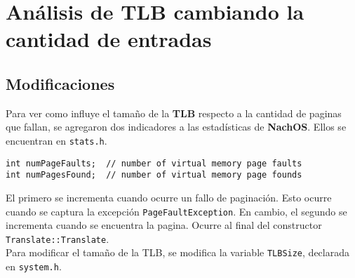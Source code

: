 \section{Análisis de TLB cambiando la cantidad de entradas}
\subsection*{Modificaciones}
Para ver como influye el tamaño de la \textbf{TLB} respecto a la cantidad de paginas que fallan, se agregaron dos indicadores a las estadísticas de \textbf{NachOS}. Ellos se encuentran en \texttt{stats.h}.
\begin{lstlisting}[style=C]
int numPageFaults;  // number of virtual memory page faults
int numPagesFound;  // number of virtual memory page founds
\end{lstlisting}
El primero se incrementa cuando ocurre un fallo de paginación. Esto ocurre cuando se captura la excepción \texttt{PageFaultException}. En cambio, el segundo se incrementa cuando se encuentra la pagina. Ocurre al final del constructor \texttt{Translate::Translate}.\\
Para modificar el tamaño de la TLB, se modifica la variable \texttt{TLBSize}, declarada en \texttt{system.h}.
